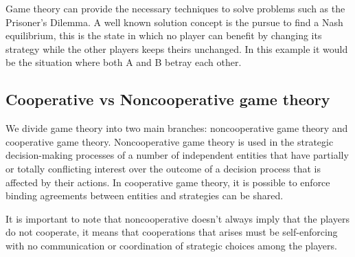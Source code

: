 Game theory can provide the necessary techniques to solve problems such as the Prisoner's Dilemma. A well known solution concept is the pursue to find a Nash equilibrium, this is the state in which no player can benefit by changing its strategy while the other players keeps theirs unchanged. In this example it would be the situation where both A and B betray each other.

\subsection{Cooperative vs Noncooperative game theory}
We divide game theory into two main branches: noncooperative game theory and cooperative game theory. Noncooperative game theory is used in the strategic decision-making processes of a number of independent entities that have partially or totally conflicting interest over the outcome of a decision process that is affected by their actions\cite{keypaper}. In cooperative game theory, it is possible to enforce binding agreements between entities and strategies can be shared. 

It is important to note that noncooperative doesn't always imply that the players do not cooperate, it means that cooperations that arises must be self-enforcing with no communication or coordination of strategic choices among the players.\cite{keypaper}
